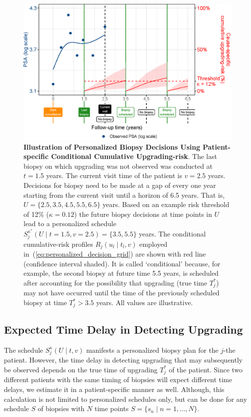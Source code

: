 \begin{figure}
\centerline{\includegraphics{images/successive_biopsy_decisions_102.eps}}
\caption{\textbf{Illustration of Personalized Biopsy Decisions Using Patient-specific Conditional Cumulative Upgrading-risk}. The last biopsy on which upgrading was not observed was conducted at $t=1.5$ years. The current visit time of the patient is $v=2.5$ years. Decisions for biopsy need to be made at a gap of every one year starting from the current visit until a horizon of 6.5 years. That is, $U=\{2.5, 3.5, 4.5, 5.5, 6.5\}$ years. Based on an example risk threshold of 12\% ($\kappa=0.12$) the future biopsy decisions at time points in $U$ lead to a personalized schedule $S_j^{\kappa^*} (U \mid t=1.5, v=2.5) = \{3.5, 5.5\}$ years. The conditional cumulative-risk profiles $R_j(u_l \mid t_l, v)$ employed in~(\ref{eq:personalized_decision_grid}) are shown with red line (confidence interval shaded). It is called `conditional' because, for example, the second biopsy at future time 5.5 years, is scheduled after accounting for the possibility that upgrading (true time $T^*_j$) may not have occurred until the time of the previously scheduled biopsy at time $T^*_j>3.5$ years. All values are illustrative.} 
\label{fig:schedule_explanation}
\end{figure}


\subsection{Expected Time Delay in Detecting Upgrading}
\label{subsec:exp_delay_estimation}
The schedule $S_j^{\kappa}(U \mid t, v)$ manifests a personalized biopsy plan for the $j$-the patient. However, the time delay in detecting upgrading that may subsequently be observed depends on the true time of upgrading $T^*_j$ of the patient. Since two different patients with the same timing of biopsies will expect different time delays, we estimate it in a patient-specific manner as well. Although, this calculation is not limited to personalized schedules only, but can be done for any schedule $S$ of biopsies with $N$ time points $S=\{s_n \mid n=1,\ldots, N\}$. 


